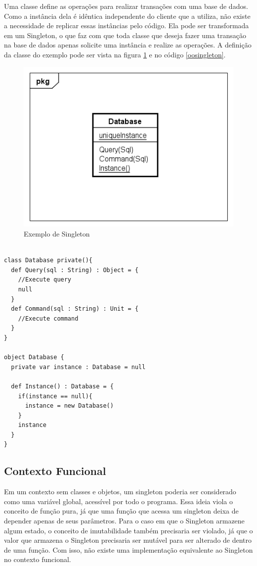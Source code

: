 Uma classe define as operações para realizar transações com 
uma base de dados. Como a instância dela é idêntica independente 
do cliente que a utiliza, não existe a necessidade de replicar 
essas instâncias pelo código. Ela pode ser transformada em 
um Singleton, o que faz com que toda classe que deseja fazer 
uma transação na base de dados apenas solicite uma instância 
e realize as operações. A definição da classe do exemplo 
pode ser vista na figura \ref{singleton_exemplo} e no 
código \ref{oosingleton}.

\begin{figure}[htb]
	\caption{\label{singleton_exemplo}Exemplo de Singleton}
	\begin{center}
	    \includegraphics[scale=0.6]{5_padroes-contexto-funcional/5.1_criacionais/5.1.5_singleton/singleton_exemplo.png}
	\end{center}
\end{figure}

\begin{lstlisting}[caption={Singleton Orientação a Objetos},label=oosingleton]

class Database private(){
  def Query(sql : String) : Object = {
    //Execute query
    null
  }
  def Command(sql : String) : Unit = {
    //Execute command
  }
}

object Database {
  private var instance : Database = null

  def Instance() : Database = {
    if(instance == null){
      instance = new Database()
    }
    instance
  }
}

\end{lstlisting}

\subsection*{Contexto Funcional}

Em um contexto sem classes e objetos, 
um singleton poderia ser considerado como 
uma variável global, acessível por 
todo o programa. Essa ideia viola o conceito 
de função pura, já que uma função que acessa 
um singleton deixa de depender apenas de seus 
parâmetros. Para o caso em que o Singleton 
armazene algum estado, o conceito de imutabilidade 
também precisaria ser violado, já que o 
valor que armazena o Singleton precisaria ser 
mutável para ser alterado de dentro de uma 
função. Com isso, não existe uma implementação 
equivalente ao Singleton no contexto funcional.